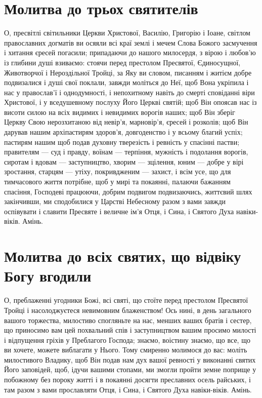 \documentclass[chapters.tex]{subfiles}
\begin{document}
\section{Молитва до трьох святителів}
О, пресвітлі світильники Церкви Христової, Василію, Григорію і Іоане, світлом православних догматів ви осяяли всі краї землі і мечем Слова Божого засмучення і хитання єресей погасили; припадаючи до нашого милосердя, з вірою і любов’ю із глибини душі взиваємо: стоячи перед престолом Пресвятої, Єдиносущної, Животворчої і Нероздільної Тройці, за Яку ви словом, писанням і житієм добре подвизалися і душі свої поклали, завжди моліться до Неї, щоб Вона укріпила і нас у православ’ї і однодумності, і непохитному навіть до смерті сповіданні віри Христової, і у вседушевному послуху Його Церкві святій; щоб Він опоясав нас із висоти силою на всіх видимих і невидимих ворогів наших; щоб Він зберіг Церкву Свою нерозхитаною від невір’я, марновір’я, єресей і розколів; щоб Він дарував нашим архіпастирям здоров’я, довгоденство і у всьому благий успіх; пастирям нашим щоб подав духовну тверезість і ревність у спасінні пастви; правителям — суд і правду, воїнам — терпіння, мужність і подолання ворогів, сиротам і вдовам — заступництво, хворим — зцілення, юним — добре у вірі зростання, старцям — утіху, покривдженим — захист, і всім усе, що для тимчасового життя потрібне, щоб у мирі та покаянні, палаючи бажанням спасіння, Господеві працюючи, добрим подвигом подвизаючись, життєвий шлях закінчивши, ми сподобилися у Царстві Небесному разом з вами завжди оспівувати і славити Пресвяте і величне ім’я Отця, і Сина, і Святого Духа навіки-віків. Амінь.

\section{Молитва до всіх святих, що відвіку Богу вгодили}
О, преблаженні угодники Божі, всі святі, що стоїте перед престолом Пресвятої Тройці і насолоджуєтеся невимовним блаженством! Ось нині, в день загального вашого торжества, милостиво спогляньте на нас, менших ваших братів і сестер, що приносимо вам цей похвальний спів і заступництвом вашим просимо милості і відпущення гріхів у Преблагого Господа; знаємо, воістину знаємо, що все, що ви хочете, можете виблагати у Нього. Тому смиренно молимося до вас: моліть милостивого Владику, щоб Він подав нам дух вашої ревності у виконанні святих Його заповідей, щоб, ідучи вашими стопами, ми змогли пройти земне поприще у побожному без пороку житті і в покаянні досягти преславних осель райських, і там разом з вами прославляти Отця, і Сина, і Святого Духа навіки-віків. Амінь.
\end{document}
